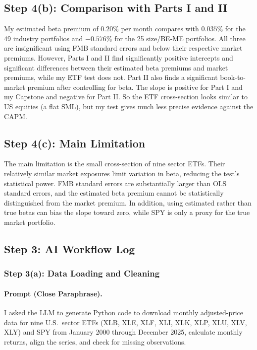 \subsection{Step 4(b): Comparison with Parts I and II}

My estimated beta premium of $0.20\%$ per month compares with $0.035\%$ for the
49 industry portfolios and $-0.576\%$ for the 25 size/BE-ME portfolios. All
three are insignificant using FMB standard errors and below their respective
market premiums. However, Parts I and II find significantly positive intercepts
and significant differences between their estimated beta premiums and market
premiums, while my ETF test does not. Part II also finds a significant
book-to-market premium after controlling for beta. The slope is positive for
Part I and my Capstone and negative for Part II. So the ETF cross-section looks
similar to US equities (a flat SML), but my test gives much less precise
evidence against the CAPM.

\subsection{Step 4(c): Main Limitation}

The main limitation is the small cross-section of nine sector ETFs. Their
relatively similar market exposures limit variation in beta, reducing the
test's statistical power. FMB standard errors are substantially larger than OLS
standard errors, and the estimated beta premium cannot be statistically
distinguished from the market premium. In addition, using estimated rather than
true betas can bias the slope toward zero, while SPY is only a proxy for the
true market portfolio.

\subsection{Step 3: AI Workflow Log}

\subsubsection*{Step 3(a): Data Loading and Cleaning}

\paragraph{Prompt (Close Paraphrase).} I asked the LLM to generate Python code
to download monthly adjusted-price data for nine U.S.\ sector ETFs (XLB, XLE,
XLF, XLI, XLK, XLP, XLU, XLV, XLY) and SPY from January 2000 through December
2025, calculate monthly returns, align the series, and check for missing
observations.

